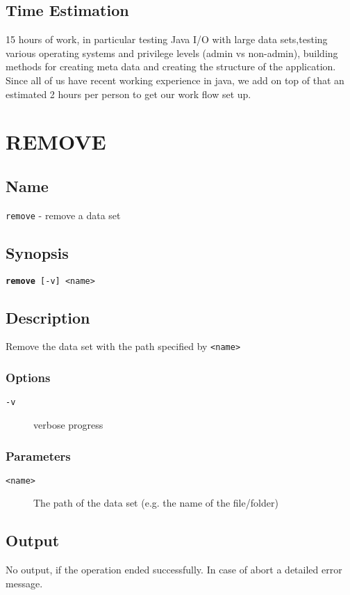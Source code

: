 \documentclass{article} %
\begin{document}
		\subsection*{Time Estimation}
		15 hours of work, in particular testing Java I/O with large data sets,testing various operating systems and privilege levels (admin vs non-admin), building methods for creating meta data and creating the structure of the application. \\
		\noindent Since all of us have recent working experience in java, we add on top of that an estimated 2 hours per person to get our work flow set up.
		\newpage
		\section*{REMOVE}
		\subsection*{Name}
		\texttt{remove} - remove a data set
		\subsection*{Synopsis}
		\texttt{\textbf{remove} [-v] <name>}
		\subsection*{Description}
		Remove the data set with the path specified by \texttt{<name>}\\
		
		\noindent
		\subsubsection*{Options}
		\begin{description}
			\item[\texttt{-v}] verbose progress
		\end{description}
		
		\subsubsection*{Parameters}
		\begin{description}
			\item[\texttt{<name>}] The path of the data set (e.g. the name of the file/folder)
		\end{description}
		\subsection*{Output}
		No output, if the operation ended successfully. In case of abort a detailed error message.
\end{document}
